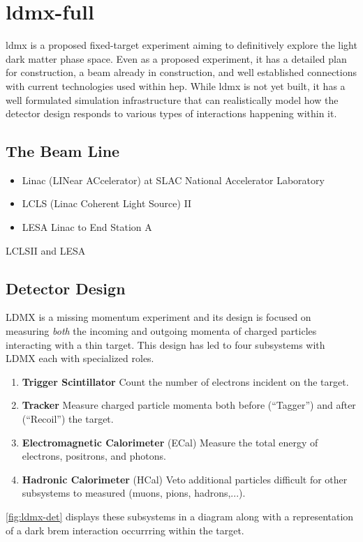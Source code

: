 \chapter{\gls{ldmx-full}}
\label{chapter:ldmx:experiment}

\gls{ldmx} is a proposed fixed-target experiment aiming to definitively explore
the light dark matter phase space. Even as a proposed experiment, it has a detailed
plan for construction, a beam already in construction, and well established connections
with current technologies used within \gls{hep}. While \gls{ldmx} is not yet built,
it has a well formulated simulation infrastructure that can realistically model
how the detector design responds to various types of interactions happening within it.

\section{The Beam Line}
\begin{itemize}
    \item Linac (LINear ACcelerator) at SLAC National Accelerator Laboratory
    \item LCLS (Linac Coherent Light Source) II \cite{lcls-ii}
    \item LESA \cite{lesa-design} Linac to End Station A
\end{itemize}
LCLSII \cite{lcls-ii} and LESA \cite{lesa-design}

\section{Detector Design}
LDMX is a missing momentum experiment and its design is focused on measuring
\emph{both} the incoming and outgoing momenta of charged particles interacting
with a thin target.
This design has led to four subsystems with LDMX each with specialized roles.
\begin{enumerate}
    \item \textbf{Trigger Scintillator} Count the number of electrons incident on the target.
    \item \textbf{Tracker} Measure charged particle momenta both before (``Tagger'') and after (``Recoil'') the target.
    \item \textbf{Electromagnetic Calorimeter} (ECal) Measure the total energy of electrons, positrons, and photons.
    \item \textbf{Hadronic Calorimeter} (HCal) Veto additional particles difficult for other subsystems to measured (muons, pions, hadrons,...).
\end{enumerate}
\cref{fig:ldmx-det} displays these subsystems in a diagram along with a representation of
a dark brem interaction occurrring within the target.

